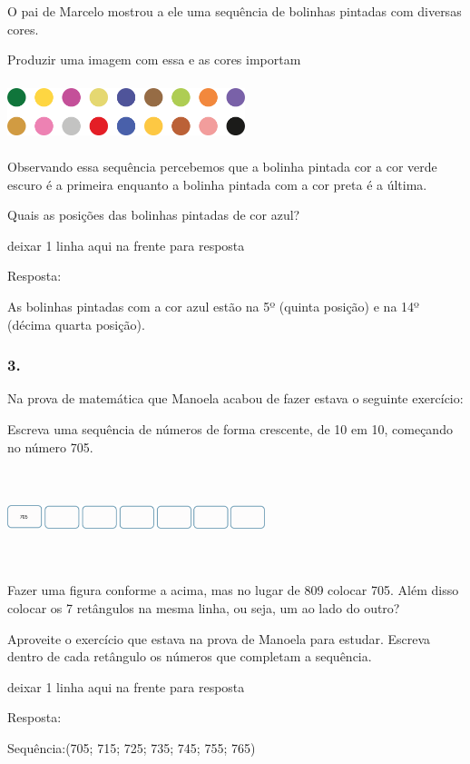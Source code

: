 O pai de Marcelo mostrou a ele uma sequência de bolinhas pintadas com
diversas cores.

Produzir uma imagem com essa e as cores importam

\includegraphics[width=2.72524in,height=0.68339in]{media/image28.png}

Observando essa sequência percebemos que a bolinha pintada cor a cor
verde escuro é a primeira enquanto a bolinha pintada com a cor preta é a
última.

Quais as posições das bolinhas pintadas de cor azul?

deixar 1 linha aqui na frente para resposta

Resposta:

As bolinhas pintadas com a cor azul estão na 5º (quinta posição) e na
14º (décima quarta posição).

\subsubsection{3.}\label{section-35}

Na prova de matemática que Manoela acabou de fazer estava o seguinte
exercício:

Escreva uma sequência de números de forma crescente, de 10 em 10,
começando no número 705.

\includegraphics[width=2.95859in,height=1.10010in]{media/image29.png}

Fazer uma figura conforme a acima, mas no lugar de 809 colocar 705. Além
disso colocar os 7 retângulos na mesma linha, ou seja, um ao lado do
outro?

Aproveite o exercício que estava na prova de Manoela para estudar.
Escreva dentro de cada retângulo os números que completam a sequência.

deixar 1 linha aqui na frente para resposta

Resposta:

Sequência:(705; 715; 725; 735; 745; 755; 765)

